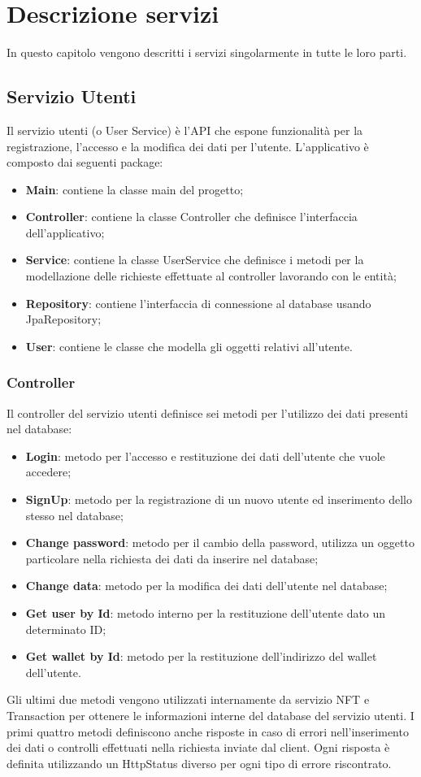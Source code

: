 \chapter{Descrizione servizi}
In questo capitolo vengono descritti i servizi singolarmente in tutte le loro parti.
\section{Servizio Utenti}
Il servizio utenti (o User Service) è l'API che espone funzionalità per la registrazione, l'accesso e la modifica dei dati per l'utente. L'applicativo è composto dai seguenti package:
\begin{itemize}
	\item \textbf{Main}: contiene la classe main del progetto;
	\item \textbf{Controller}: contiene la classe Controller che definisce l'interfaccia dell'applicativo;
	\item \textbf{Service}: contiene la classe UserService che definisce i metodi per la modellazione delle richieste effettuate al controller lavorando con le entità;
	\item \textbf{Repository}: contiene l'interfaccia di connessione al database usando JpaRepository;
	\item \textbf{User}: contiene le classe che modella gli oggetti relativi all'utente.
\end{itemize}
\subsection{Controller}
Il controller del servizio utenti definisce sei metodi per l'utilizzo dei dati presenti nel database:
\begin{itemize}
	\item \textbf{Login}: metodo per l'accesso e restituzione dei dati dell'utente che vuole accedere;
	\item \textbf{SignUp}: metodo per la registrazione di un nuovo utente ed inserimento dello stesso nel database;
	\item \textbf{Change password}: metodo per il cambio della password, utilizza un oggetto particolare nella richiesta dei dati da inserire nel database;
	\item \textbf{Change data}: metodo per la modifica dei dati dell'utente nel database;
	\item \textbf{Get user by Id}: metodo interno per la restituzione dell'utente dato un determinato ID;
	\item \textbf{Get wallet by Id}: metodo per la restituzione dell'indirizzo del wallet dell'utente.
\end{itemize}
Gli ultimi due metodi vengono utilizzati internamente da servizio NFT e Transaction per ottenere le informazioni interne del database del servizio utenti.
I primi quattro metodi definiscono anche risposte in caso di errori nell'inserimento dei dati o controlli effettuati nella richiesta inviate dal client. Ogni risposta è definita utilizzando un HttpStatus diverso per ogni tipo di errore riscontrato.
